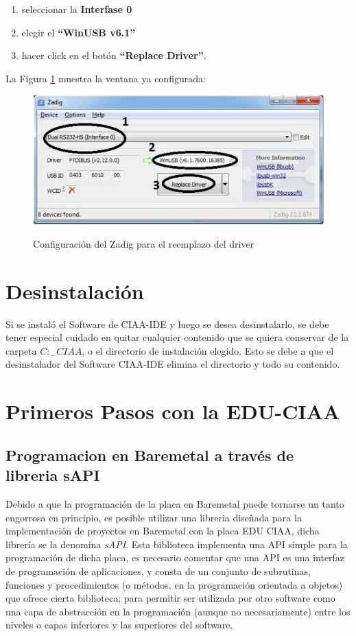 \documentclass[12pt,letterpaper]{article}
\begin{document}
\begin{enumerate}
\item[1]seleccionar la \textbf{Interfase 0}
\item[2]elegir el \textbf{“WinUSB v6.1”}
\item[2]hacer click en el botón \textbf{“Replace Driver”}.
\end{enumerate}

La Figura \ref{Fig17} muestra la ventana ya configurada:


\begin{figure}[!h]
\centering
\includegraphics[width=8 cm]{figuras/instalacion15.png}\\
\caption{Configuración del Zadig para el reemplazo del driver}
\label{Fig17}
\end{figure}


\section{Desinstalación}
Si se instaló el Software de CIAA-IDE y luego se desea desinstalarlo, se debe tener especial
cuidado en quitar cualquier contenido que se quiera conservar de la carpeta $C:\_\ CIAA$, o el
directorio de instalación elegido. Esto se debe a que el desinstalador del Software CIAA-IDE
elimina el directorio y todo su contenido.

\section{Primeros Pasos con la EDU-CIAA}

\subsection{Programacion en Baremetal a través de libreria sAPI}\label{sec:programacionbaremetal}
Debido a que la programación de la placa en Baremetal puede tornarse un tanto engorrosa en principio, es posible utilizar una libreria diseñada para la implementación de proyectos en Baremetal con la placa EDU CIAA, dicha librería se la denomina \textit{sAPI}. Esta biblioteca implementa una API simple para la programación de dicha placa, es necesario comentar que una API es una interfaz de programación de aplicaciones, y consta de un conjunto de subrutinas, funciones y procedimientos (o métodos, en la programación orientada a objetos) que ofrece cierta biblioteca; para permitir ser utilizada por otro software como una capa de abstracción en la programación (aunque no necesariamente) entre los niveles o capas inferiores y las superiores del software\cite{sapi}.
 \\
 
\end{document}
